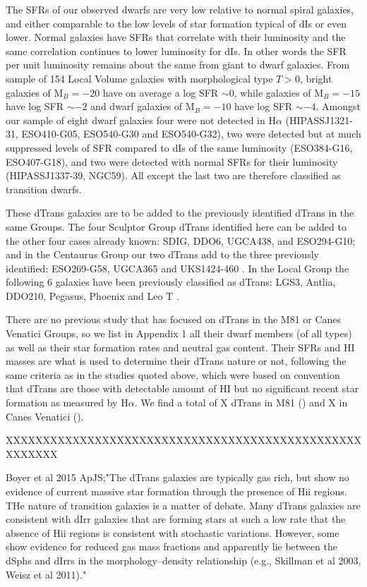 \documentclass[12pt,preprint]{emulateapj}
\begin{document}
The SFRs of our observed dwarfs are very low relative to normal spiral galaxies, and 
either comparable to the low levels of star formation typical of dIs or even lower. Normal galaxies have SFRs that correlate with their luminosity 
and the same correlation continues to lower luminosity for dIs. In other words the SFR per unit luminosity remains about the same from giant to 
dwarf galaxies. From \cite{kai07}  sample of 154 Local Volume galaxies with morphological type $T>0$, bright galaxies of M$_B=-20$ have on average
a log SFR $\sim 0$, while galaxies of M$_B=-15$ have log SFR $\sim -2$ and dwarf galaxies of M$_B=-10$ have log SFR $\sim -4$.
Amongst our sample of eight dwarf galaxies four were not detected in H$\alpha$ (HIPASSJ1321-31, ESO410-G05, ESO540-G30 and ESO540-G32), two were detected but at much suppressed levels of SFR compared to dIs of  
 the same luminosity (ESO384-G16, ESO407-G18), and two were detected with normal SFRs for their luminosity (HIPASSJ1337-39, NGC59). 
All except the last two are therefore classified as transition dwarfs.

These dTrans galaxies are to be added to the previously identified dTrans in the same Groups. The four Sculptor Group dTrans 
identified here can be added to the other four cases already known: SDIG, DDO6, UGCA438, and ESO294-G10; and in the Centaurus Group
our two dTrans add to the three previously identified: ESO269-G58, UGCA365 and UKS1424-460 \citep{cds09}. In the Local Group the 
following 6 galaxies have been previously classified as dTrans: LGS3, Antlia, DDO210, Pegasus, Phoenix \citep{m98} and Leo T \cite{ibe07}.

There are no previous study that has focused on dTrans in the M81 or Canes Venatici Groups, so we list in 
Appendix 1 all their dwarf members (of all types) as well as their star formation rates and neutral gas content.
Their SFRs and HI masses are what is used to determine their dTrans nature or not, following the same criteria as in the studies quoted above, which were based on \citep{m98} convention that dTrans are those with detectable amount 
of HI but no significant recent star formation as measured by H$\alpha$.
We find a total of X dTrans in M81 () and X in Canes Venatici ().


XXXXXXXXXXXXXXXXXXXXXXXXXXXXXXXXXXXXXXXXXXXXXXXXXXXXXXX


Boyer et al 2015 ApJS;"The dTrans galaxies are typically gas rich, but show no evidence of current massive star formation through the presence of 
Hii regions. THe nature of transition galaxies is a matter of debate. Many dTrans galaxies are consistent with dIrr 
galaxies that are forming stars at such a low rate that the absence of Hii regions is consistent 
with stochastic variations. However, some show evidence for reduced gas mass fractions and apparently lie between the dSphs 
and dIrrs in the morphology–density relationship (e.g., Skillman et al 2003, Weisz et al 2011)."
\end{document}
